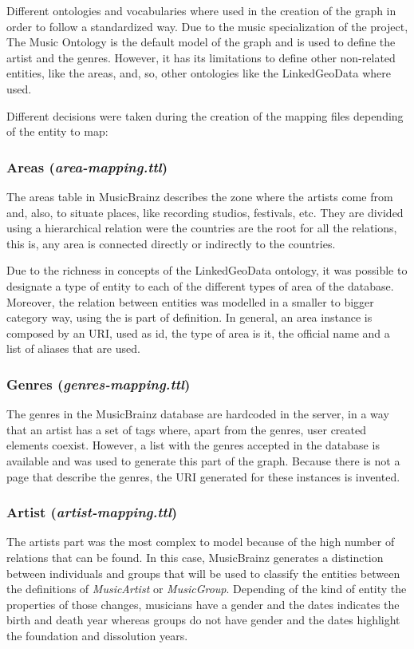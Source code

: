 Different ontologies and vocabularies where used in the creation of the graph in order to follow a standardized way.
Due to the music specialization of the project, The Music Ontology \citep{music_ontology} is the default model of the graph and is used to define the artist and the genres.
However, it has its limitations to define other non-related entities, like the areas, and, so, other ontologies like the LinkedGeoData \citep{linkedgeodata} where used. 

Different decisions were taken during the creation of the mapping files depending of the entity to map:

\subsubsection{Areas (\textit{area-mapping.ttl})}
The areas table in MusicBrainz describes the zone where the artists come from and, also, to situate places, like recording studios, festivals, etc.
They are divided using a hierarchical relation were the countries are the root for all the relations, this is, any area is connected directly or indirectly to the countries.  

Due to the richness in concepts of the LinkedGeoData ontology, it was possible to designate a type of entity to each of the different types of area of the database.
Moreover, the relation between entities was modelled in a smaller to bigger category way, using the is part of definition.
In general, an area instance is composed by an URI, used as id, the type of area is it, the official name and a list of aliases that are used. 

\subsubsection{Genres (\textit{genres-mapping.ttl})}
The genres in the MusicBrainz database are hardcoded in the server, in a way that an artist has a set of tags where, apart from the genres, user created elements coexist.
However, a list with the genres accepted in the database is available and was used to generate this part of the graph.
Because there is not a page that describe the genres, the URI generated for these instances is invented. 

\subsubsection{Artist (\textit{artist-mapping.ttl})}
The artists part was the most complex to model because of the high number of relations that can be found. In this case, MusicBrainz generates a distinction between individuals and groups that will be used to classify the entities between the definitions of \textit{MusicArtist} or \textit{MusicGroup}. Depending of the kind of entity the properties of those changes, musicians have a gender and the dates indicates the birth and death year whereas groups do not have gender and the dates highlight the foundation and dissolution years. 

